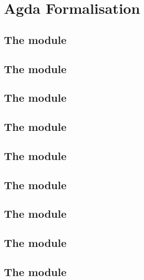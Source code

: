 \chapter{Agda Formalisation}\label{app:agda-form}

\section{The  module}

{
  \footnotesize
  
}

\section{The  module}

{
  \footnotesize
  
}

\section{The  module}

\footnotesize


\section{The  module}

{
  \footnotesize
  
}

\section{The  module}

{
  \footnotesize
  
}

\section{The  module}

{
  \footnotesize
  
}

\section{The  module}

{
  \footnotesize
  
}

\section{The  module}

{
  \footnotesize
  
}

\section{The  module}

{
  \footnotesize
  
}
